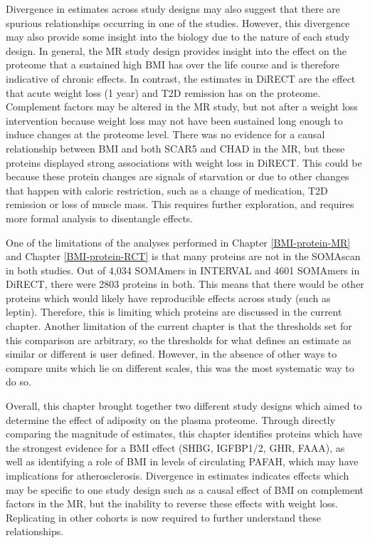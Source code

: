 \documentclass[11pt,twoside]{bristolthesis}
\begin{document}
Divergence in estimates across study designs may also suggest that there are spurious relationships occurring in one of the studies. However, this divergence may also provide some insight into the biology due to the nature of each study design. In general, the MR study design provides insight into the effect on the proteome that a sustained high BMI has over the life course and is therefore indicative of chronic effects. In contrast, the estimates in DiRECT are the effect that acute weight loss (1 year) and T2D remission has on the proteome. Complement factors may be altered in the MR study, but not after a weight loss intervention because weight loss may not have been sustained long enough to induce changes at the proteome level. There was no evidence for a causal relationship between BMI and both SCAR5 and CHAD in the MR, but these proteins displayed strong associations with weight loss in DiRECT. This could be because these protein changes are signals of starvation or due to other changes that happen with caloric restriction, such as a change of medication, T2D remission or loss of muscle mass. This requires further exploration, and requires more formal analysis to disentangle effects.

One of the limitations of the analyses performed in Chapter \ref{BMI-protein-MR} and Chapter \ref{BMI-protein-RCT} is that many proteins are not in the SOMAscan in both studies. Out of 4,034 SOMAmers in INTERVAL and 4601 SOMAmers in DiRECT, there were 2803 proteins in both. This means that there would be other proteins which would likely have reproducible effects across study (such as leptin). Therefore, this is limiting which proteins are discussed in the current chapter. Another limitation of the current chapter is that the thresholds set for this comparison are arbitrary, so the thresholds for what defines an estimate as similar or different is user defined. However, in the absence of other ways to compare units which lie on different scales, this was the most systematic way to do so.

Overall, this chapter brought together two different study designs which aimed to determine the effect of adiposity on the plasma proteome. Through directly comparing the magnitude of estimates, this chapter identifies proteins which have the strongest evidence for a BMI effect (SHBG, IGFBP1/2, GHR, FAAA), as well as identifying a role of BMI in levels of circulating PAFAH, which may have implications for atherosclerosis. Divergence in estimates indicates effects which may be specific to one study design such as a causal effect of BMI on complement factors in the MR, but the inability to reverse these effects with weight loss. Replicating in other cohorts is now required to further understand these relationships.
\end{document}
